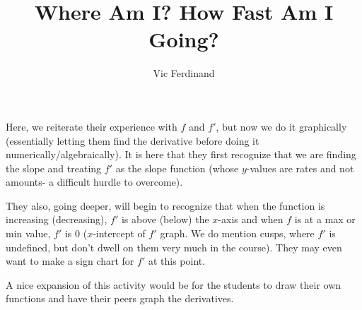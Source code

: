 \documentclass{ximera}
\author{Vic Ferdinand}
\title{Where Am I?  How Fast Am I Going?}
\begin{document}
\begin{abstract}
\end{abstract}
\maketitle


\begin{instructorIntro}
Here, we reiterate their experience with $f$ and $f'$, but now we do it graphically (essentially letting them find the derivative before doing it numerically/algebraically).  It is here that they first recognize that we are finding the slope and treating $f'$ as the slope function (whose $y$-values are rates and not amounts- a difficult hurdle to overcome).  

They also, going deeper, will begin to recognize that when the function is increasing (decreasing), $f'$ is above (below) the $x$-axis and when $f$ is at a max or min value, $f'$ is $0$ ($x$-intercept of $f'$ graph.  We do mention cusps, where $f'$ is undefined, but don't dwell on them very much in the course).  They may even want to make a sign chart for $f'$ at this point.

A nice expansion of this activity would be for the students to draw their own functions and have their peers graph the derivatives.
\end{instructorIntro}
\end{document}
